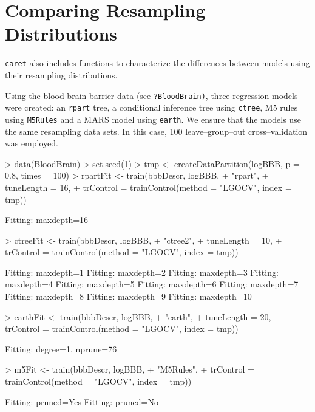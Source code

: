 \documentclass[12pt]{article}
\begin{document}
\clearpage

\section{Comparing Resampling Distributions}

\texttt{caret} also includes functions to characterize the differences between models using their resampling distributions. 

Using the blood-brain barrier data (see \texttt{?BloodBrain)}, three regression models were
created: an \texttt{rpart} tree, a conditional inference tree using
\texttt{ctree}, M5 rules using \texttt{M5Rules} and a MARS model using \texttt{earth}. We ensure that the models use the same resampling data sets. In this case, 100 leave--group--out cross--validation was employed.

\begin{Schunk}
\begin{Sinput}
> data(BloodBrain)
> set.seed(1)
> tmp <- createDataPartition(logBBB, p = 0.8, times = 100)
> rpartFit <- train(bbbDescr, logBBB,
+                   "rpart", 
+                   tuneLength = 16,
+                   trControl = trainControl(method = "LGOCV", index = tmp))
\end{Sinput}
\begin{Soutput}
Fitting: maxdepth=16 
\end{Soutput}
\begin{Sinput}
> ctreeFit <- train(bbbDescr, logBBB,
+                  "ctree2",
+                   tuneLength = 10,
+                   trControl = trainControl(method = "LGOCV", index = tmp))
\end{Sinput}
\begin{Soutput}
Fitting: maxdepth=1 
Fitting: maxdepth=2 
Fitting: maxdepth=3 
Fitting: maxdepth=4 
Fitting: maxdepth=5 
Fitting: maxdepth=6 
Fitting: maxdepth=7 
Fitting: maxdepth=8 
Fitting: maxdepth=9 
Fitting: maxdepth=10 
\end{Soutput}
\begin{Sinput}
> earthFit <- train(bbbDescr, logBBB,
+                   "earth",
+                   tuneLength = 20,
+                   trControl = trainControl(method = "LGOCV", index = tmp))
\end{Sinput}
\begin{Soutput}
Fitting: degree=1, nprune=76 
\end{Soutput}
\end{Schunk}
\begin{Sinput}
> m5Fit <- train(bbbDescr, logBBB,
+                "M5Rules",
+                trControl = trainControl(method = "LGOCV", index = tmp))    
\end{Sinput}
\begin{Soutput}
Fitting: pruned=Yes 
Fitting: pruned=No 
\end{Soutput}
\end{document}

